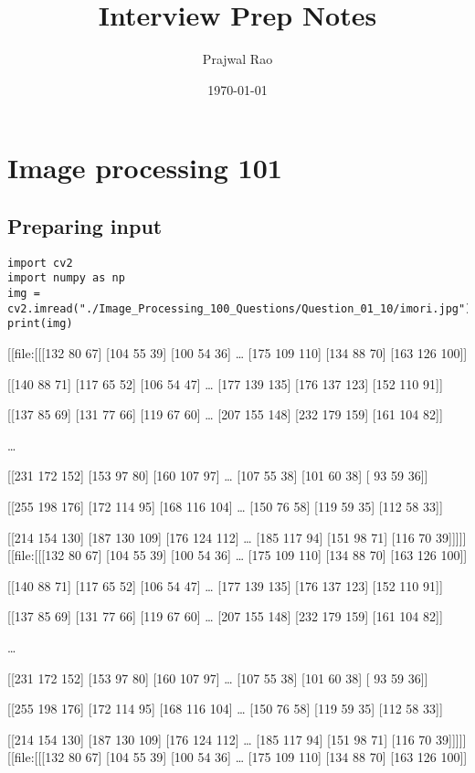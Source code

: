 \documentclass[letterpaper, 11pt]{article}
\author{Prajwal Rao}
\date{\today}
\title{Interview Prep Notes}
\begin{document}
\maketitle
\tableofcontents

\section{Image processing 101}
\label{sec:org496bfb5}
\subsection{Preparing input}
\label{sec:org8d01d9a}
\begin{verbatim}
import cv2
import numpy as np
img = cv2.imread("./Image_Processing_100_Questions/Question_01_10/imori.jpg")
print(img)
\end{verbatim}
[[file:[[[132  80  67]
  [104  55  39]
  [100  54  36]
  \ldots{}
  [175 109 110]
  [134  88  70]
  [163 126 100]]

[[140  88  71]
 [117  65  52]
 [106  54  47]
 \ldots{}
 [177 139 135]
 [176 137 123]
 [152 110  91]]

[[137  85  69]
 [131  77  66]
 [119  67  60]
 \ldots{}
 [207 155 148]
 [232 179 159]
 [161 104  82]]

\ldots{}

[[231 172 152]
 [153  97  80]
 [160 107  97]
 \ldots{}
 [107  55  38]
 [101  60  38]
 [ 93  59  36]]

[[255 198 176]
 [172 114  95]
 [168 116 104]
 \ldots{}
 [150  76  58]
 [119  59  35]
 [112  58  33]]

 [[214 154 130]
  [187 130 109]
  [176 124 112]
  \ldots{}
  [185 117  94]
  [151  98  71]
  [116  70  39]]]]]
[[file:[[[132  80  67]
  [104  55  39]
  [100  54  36]
  \ldots{}
  [175 109 110]
  [134  88  70]
  [163 126 100]]

[[140  88  71]
 [117  65  52]
 [106  54  47]
 \ldots{}
 [177 139 135]
 [176 137 123]
 [152 110  91]]

[[137  85  69]
 [131  77  66]
 [119  67  60]
 \ldots{}
 [207 155 148]
 [232 179 159]
 [161 104  82]]

\ldots{}

[[231 172 152]
 [153  97  80]
 [160 107  97]
 \ldots{}
 [107  55  38]
 [101  60  38]
 [ 93  59  36]]

[[255 198 176]
 [172 114  95]
 [168 116 104]
 \ldots{}
 [150  76  58]
 [119  59  35]
 [112  58  33]]

 [[214 154 130]
  [187 130 109]
  [176 124 112]
  \ldots{}
  [185 117  94]
  [151  98  71]
  [116  70  39]]]]]
[[file:[[[132  80  67]
  [104  55  39]
  [100  54  36]
  \ldots{}
  [175 109 110]
  [134  88  70]
  [163 126 100]]
\end{document}
